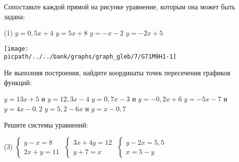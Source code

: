 \begin{homework}[number=1]
	\begin{listofex}
		\item 
		\begin{minipage}[t]{0.4\linewidth}
		Сопоставьте каждой прямой на рисунке уравнение, которым она может быть задана:
		\begin{tasks}(1)
			\task \( y=0,5 x+4 \)
			\task \( y=5x + 8 \)
			\task \( y=-x-2 \)
			\task \( y=-2x+5 \)
		\end{tasks}
	\end{minipage}
		\begin{minipage}[t]{0.55\linewidth}
			\texttt{[image: \\picpath/../../bank/graphs/graph\_gleb/7/G71M9H1-1]}
		\end{minipage}
		
		\item Не выполняя построения, найдите координаты точек пересечения графиков функций:
		\begin{tasks}
			\task \( y=13x +5 \) и \(y=12,3x-4\)
			\task \( y=0,7x-3 \) и \(y=-0,2x+6\)
			\task \( y=-5x-7 \) и \( y=4x-0,2 \)
			\task \( y=5,2-6x \) и \( y=x-0,7 \)
		\end{tasks}
		\item Решите системы уравнений:
		\begin{tasks}(3)
			\task \( \begin{cases} y-x=8 \\ 2x+y=11 \end{cases} \)
			\task \( \begin{cases} 3x+4y = 12 \\ y+7=x \end{cases} \)
			\task \( \begin{cases} y-2x=5,5 \\ x=5-y \end{cases} \)
		\end{tasks}
	\end{listofex}
\end{homework}

